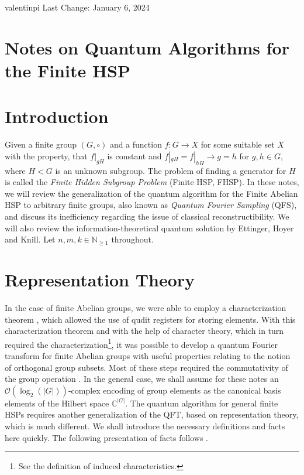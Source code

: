 \documentclass[10pt]{amsart}
\theoremstyle{definition}
\theoremstyle{remark}
\newcommand{\onot}{\mathcal{O}}
\begin{document}
    valentinpi \hfill Last Change: January 6, 2024

    \section*{Notes on Quantum Algorithms for the Finite HSP}

    \section{Introduction} \phantom{} \label{introduction}

    Given a finite group \((G, \circ)\) and a function \(f\colon G \to X\) for some suitable set \(X\) with the property, that \(f|_{gH}\) is constant and \(f|_{gH} = f|_{hH} \to g = h\) for \(g, h \in G\), where \(H < G\) is an unknown subgroup. The problem of finding a generator for \(H\) is called the \emph{Finite Hidden Subgroup Problem} (Finite HSP, FHSP). In these notes, we will review the generalization of the quantum algorithm for the Finite Abelian HSP to arbitrary finite groups, also known as \emph{Quantum Fourier Sampling} (QFS), and discuss its inefficiency regarding
    the issue of classical reconstructibility. We will also review the information-theoretical quantum solution by Ettinger, Hoyer and Knill.
    Let \(n, m, k \in \mathbb{N}_{\geq 1}\) throughout.

    \section{Representation Theory} \phantom{}

    In the case of finite Abelian groups, we were able to employ a characterization theorem \cite[pp. 132-135]{Fischer}, which allowed the use of qudit registers for storing elements. With this characterization theorem and with the help of character theory, which in turn required the characterization\footnote{See the definition of induced characteristics.}, it was possible to develop a quantum Fourier transform for finite Abelian groups with useful properties relating to the notion of orthogonal group subsets. Most of these steps required the commutativity of the group operation \cite[pp. 17-20]{Lomont2004}. In the general case, we shall assume for these notes an \(\onot(\log_2(|G|))\)-complex encoding of group elements as the canonical basis elements of the Hilbert space \(\mathbb{C}^{|G|}\). The quantum algorithm for general finite HSPs requires another generalization of the QFT, based on representation theory, which is much different. We shall introduce the necessary definitions and facts here quickly. The following presentation of facts follows \cite[pp. 25-28]{Lomont2004}.
\end{document}
